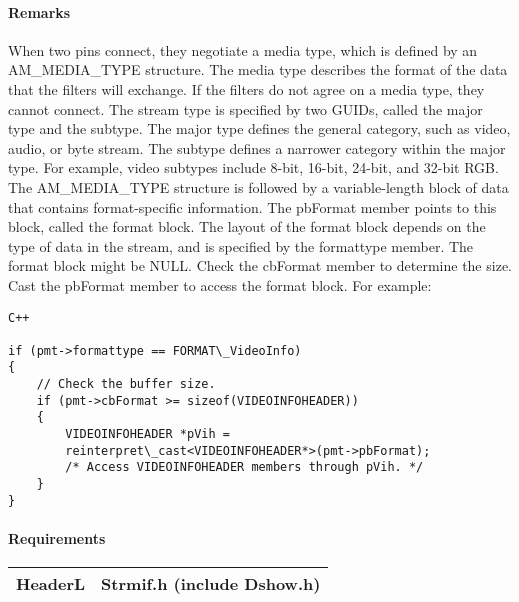 \paragraph{Remarks}

When two pins connect, they negotiate a media type, which is defined by an AM\_MEDIA\_TYPE structure. The media type describes the format of the data that the filters will exchange. If the filters do not agree on a media type, they cannot connect.
The stream type is specified by two GUIDs, called the major type and the subtype. The major type defines the general category, such as video, audio, or byte stream. The subtype defines a narrower category within the major type. For example, video subtypes include 8-bit, 16-bit, 24-bit, and 32-bit RGB.\\
The AM\_MEDIA\_TYPE structure is followed by a variable-length block of data that contains format-specific information. The pbFormat member points to this block, called the format block. The layout of the format block depends on the type of data in the stream, and is specified by the formattype member. The format block might be NULL. Check the cbFormat member to determine the size. Cast the pbFormat member to access the format block. For example:

\begin{verbatim}
C++

if (pmt->formattype == FORMAT\_VideoInfo)
{
    // Check the buffer size.
    if (pmt->cbFormat >= sizeof(VIDEOINFOHEADER))
    {
        VIDEOINFOHEADER *pVih = 
        reinterpret\_cast<VIDEOINFOHEADER*>(pmt->pbFormat);
        /* Access VIDEOINFOHEADER members through pVih. */
    }
}
\end{verbatim}
\paragraph{Requirements}
\begin{tabular}[h]{|l|l|}
	\hline
	HeaderL & Strmif.h (include Dshow.h)\\
	\hline
\end{tabular}



